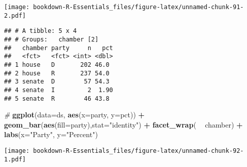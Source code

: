 \documentclass[
]{book}
\newenvironment{Shaded}{\begin{snugshade}}{\end{snugshade}}
\newcommand{\CommentTok}[1]{\textcolor[rgb]{0.56,0.35,0.01}{\textit{#1}}}
\newcommand{\DataTypeTok}[1]{\textcolor[rgb]{0.13,0.29,0.53}{#1}}
\newcommand{\DecValTok}[1]{\textcolor[rgb]{0.00,0.00,0.81}{#1}}
\newcommand{\KeywordTok}[1]{\textcolor[rgb]{0.13,0.29,0.53}{\textbf{#1}}}
\newcommand{\NormalTok}[1]{#1}
\newcommand{\OperatorTok}[1]{\textcolor[rgb]{0.81,0.36,0.00}{\textbf{#1}}}
\newcommand{\StringTok}[1]{\textcolor[rgb]{0.31,0.60,0.02}{#1}}
\begin{document}
\texttt{[image: bookdown-R-Essentials\_files/figure-latex/unnamed-chunk-91-2.pdf]}

\begin{Shaded}
\end{Shaded}

\begin{verbatim}
## # A tibble: 5 x 4
## # Groups:   chamber [2]
##   chamber party     n   pct
##   <fct>   <fct> <int> <dbl>
## 1 house   D       202 46.0 
## 2 house   R       237 54.0 
## 3 senate  D        57 54.3 
## 4 senate  I         2  1.90
## 5 senate  R        46 43.8
\end{verbatim}

\begin{Shaded}
\begin{Highlighting}[]
\CommentTok{#}
\KeywordTok{ggplot}\NormalTok{(}\DataTypeTok{data=}\NormalTok{ds, }\KeywordTok{aes}\NormalTok{(}\DataTypeTok{x=}\NormalTok{party, }\DataTypeTok{y=}\NormalTok{pct)) }\OperatorTok{+}\StringTok{ }
\StringTok{  }\KeywordTok{geom_bar}\NormalTok{(}\KeywordTok{aes}\NormalTok{(}\DataTypeTok{fill=}\NormalTok{party),}\DataTypeTok{stat=}\StringTok{"identity"}\NormalTok{) }\OperatorTok{+}
\StringTok{  }\KeywordTok{facet_wrap}\NormalTok{( }\OperatorTok{~}\StringTok{ }\NormalTok{chamber) }\OperatorTok{+}
\StringTok{  }\KeywordTok{labs}\NormalTok{(}\DataTypeTok{x=}\StringTok{"Party"}\NormalTok{, }\DataTypeTok{y=}\StringTok{"Percent"}\NormalTok{)}
\end{Highlighting}
\end{Shaded}

\texttt{[image: bookdown-R-Essentials\_files/figure-latex/unnamed-chunk-92-1.pdf]}
\end{document}
